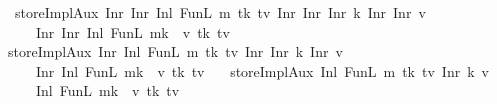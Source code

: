 \begin{isabellebody}
\ \ \ \ {\isachardoublequoteopen}storeImplAux\ {\isacharparenleft}{\kern0pt}Inr\ {\isacharparenleft}{\kern0pt}Inr\ {\isacharparenleft}{\kern0pt}Inl\ {\isacharparenleft}{\kern0pt}FunL\ m\ tk\ tv{\isacharparenright}{\kern0pt}{\isacharparenright}{\kern0pt}{\isacharparenright}{\kern0pt}{\isacharparenright}{\kern0pt}\ {\isacharparenleft}{\kern0pt}Inr\ {\isacharparenleft}{\kern0pt}Inr\ {\isacharparenleft}{\kern0pt}Inr\ k{\isacharparenright}{\kern0pt}{\isacharparenright}{\kern0pt}{\isacharparenright}{\kern0pt}\ {\isacharparenleft}{\kern0pt}Inr\ {\isacharparenleft}{\kern0pt}Inr\ v{\isacharparenright}{\kern0pt}{\isacharparenright}{\kern0pt}\isanewline
\ \ \ \ \ \ {\isacharequal}{\kern0pt}\ {\isacharparenleft}{\kern0pt}Inr\ {\isacharparenleft}{\kern0pt}Inr\ {\isacharparenleft}{\kern0pt}Inl\ {\isacharparenleft}{\kern0pt}FunL\ {\isacharparenleft}{\kern0pt}m{\isacharparenleft}{\kern0pt}k\ {\isacharcolon}{\kern0pt}{\isacharequal}{\kern0pt}\ v{\isacharparenright}{\kern0pt}{\isacharparenright}{\kern0pt}\ tk\ tv{\isacharparenright}{\kern0pt}{\isacharparenright}{\kern0pt}{\isacharparenright}{\kern0pt}{\isacharparenright}{\kern0pt}{\isachardoublequoteclose}\isanewline
\ \ {\isacharbar}{\kern0pt}\ {\isachardoublequoteopen}storeImplAux\ {\isacharparenleft}{\kern0pt}Inr\ {\isacharparenleft}{\kern0pt}Inl\ {\isacharparenleft}{\kern0pt}FunL\ m\ tk\ tv{\isacharparenright}{\kern0pt}{\isacharparenright}{\kern0pt}{\isacharparenright}{\kern0pt}\ {\isacharparenleft}{\kern0pt}Inr\ {\isacharparenleft}{\kern0pt}Inr\ k{\isacharparenright}{\kern0pt}{\isacharparenright}{\kern0pt}\ {\isacharparenleft}{\kern0pt}Inr\ v{\isacharparenright}{\kern0pt}\isanewline
\ \ \ \ \ \ {\isacharequal}{\kern0pt}\ {\isacharparenleft}{\kern0pt}Inr\ {\isacharparenleft}{\kern0pt}Inl\ {\isacharparenleft}{\kern0pt}FunL\ {\isacharparenleft}{\kern0pt}m{\isacharparenleft}{\kern0pt}k\ {\isacharcolon}{\kern0pt}{\isacharequal}{\kern0pt}\ v{\isacharparenright}{\kern0pt}{\isacharparenright}{\kern0pt}\ tk\ tv{\isacharparenright}{\kern0pt}{\isacharparenright}{\kern0pt}{\isacharparenright}{\kern0pt}{\isachardoublequoteclose}\isanewline
\ \ {\isacharbar}{\kern0pt}\ {\isachardoublequoteopen}storeImplAux\ {\isacharparenleft}{\kern0pt}Inl\ {\isacharparenleft}{\kern0pt}FunL\ m\ tk\ tv{\isacharparenright}{\kern0pt}{\isacharparenright}{\kern0pt}\ {\isacharparenleft}{\kern0pt}Inr\ k{\isacharparenright}{\kern0pt}\ v\isanewline
\ \ \ \ \ \ {\isacharequal}{\kern0pt}\ {\isacharparenleft}{\kern0pt}Inl\ {\isacharparenleft}{\kern0pt}FunL\ {\isacharparenleft}{\kern0pt}m{\isacharparenleft}{\kern0pt}k\ {\isacharcolon}{\kern0pt}{\isacharequal}{\kern0pt}\ v{\isacharparenright}{\kern0pt}{\isacharparenright}{\kern0pt}\ tk\ tv{\isacharparenright}{\kern0pt}{\isacharparenright}{\kern0pt}{\isachardoublequoteclose}\isanewline

\end{isabellebody}
